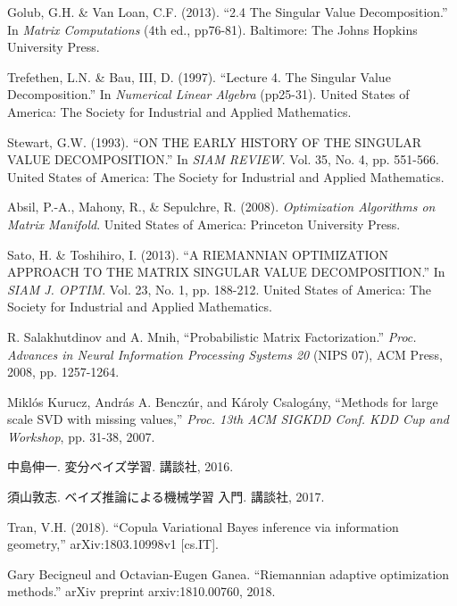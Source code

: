 
\begin{thebibliography}{99}

Golub, G.H. \& Van Loan, C.F. (2013). “2.4 The Singular Value Decomposition.” In \emph{Matrix Computations} (4th ed., pp76-81). Baltimore: The Johns Hopkins University Press.

Trefethen, L.N. \& Bau, III, D. (1997). “Lecture 4. The Singular Value Decomposition.” In \emph{Numerical Linear Algebra} (pp25-31). United States of America: The Society for Industrial and Applied Mathematics.

Stewart, G.W. (1993). “ON THE EARLY HISTORY OF THE SINGULAR VALUE DECOMPOSITION.” In \emph{SIAM REVIEW}. Vol. 35, No. 4, pp. 551-566. United States of America: The Society for Industrial and Applied Mathematics.

Absil, P.-A., Mahony, R., \& Sepulchre, R. (2008). \emph{Optimization Algorithms on Matrix Manifold}. United States of America: Princeton University Press.

Sato, H. \& Toshihiro, I. (2013). “A RIEMANNIAN OPTIMIZATION APPROACH TO THE MATRIX SINGULAR VALUE DECOMPOSITION.” In \emph{SIAM J. OPTIM}. Vol. 23, No. 1, pp. 188-212. United States of America: The Society for Industrial and Applied Mathematics.

R. Salakhutdinov and A. Mnih, “Probabilistic Matrix Factorization.” \emph{Proc. Advances in Neural Information Processing Systems 20} (NIPS 07), ACM Press, 2008, pp. 1257-1264.

Miklós Kurucz, András A. Benczúr, and Károly Csalogány, “Methods for large scale SVD with missing values,” \emph{Proc. 13th ACM SIGKDD Conf. KDD Cup and Workshop}, pp. 31-38, 2007.

中島伸一. 変分ベイズ学習. 講談社, 2016.

須山敦志. ベイズ推論による機械学習 入門. 講談社, 2017.

Tran, V.H. (2018). “Copula Variational Bayes inference via information geometry,” arXiv:1803.10998v1 [cs.IT].

Gary Becigneul and Octavian-Eugen Ganea. “Riemannian adaptive optimization methods.” arXiv
preprint arxiv:1810.00760, 2018.

\end{thebibliography}
